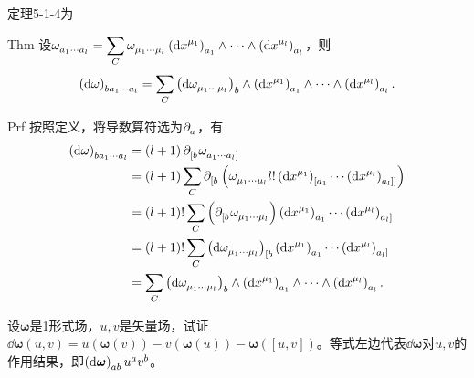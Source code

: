 \begin{xiti}
	\begin{zm}
		定理5-1-4为
		\begin{yl}{Thm}
			设$\displaystyle \tensor{\omega}{_{a_1 \cdots a_l }} = \sum_{C} \tensor{\omega}{_{\mu_1 \cdots \mu_l}} \tensor{\left(\dd{x^{\mu_1}}\right)}{_{a_1}} \wedge \cdots \wedge  \tensor{\left(\dd{x^{\mu_l}}\right)}{_{a_l}} $，则\[ \tensor{\left(\dd{\omega}\right)}{_{b a_1 \cdots a_l}} = \sum_{C} \tensor{\left(\dd{\tensor{\omega}{_{\mu_1 \cdots \mu_l}}}\right)}{_b} \wedge \tensor{\left(\dd{x^{\mu_1}}\right)}{_{a_1}} \wedge \cdots \wedge \tensor{\left(\dd{x^{\mu_l}}\right)}{_{a_l}}. \]
		\end{yl}
	    \begin{yl}{Prf}
	    	按照定义，将导数算符选为$\Partial{a} $，有
	    	\begin{align*}
	    	\tensor{\left(\dd{\omega}\right)}{_{b a_1 \cdots a_l}} &= \left(l+1\right) \Partial{[b} \tensor{\omega}{_{a_1 \cdots a_l]}}\\
	    	&= \left(l+1\right) \sum_{C} \Partial{[b} \left(\tensor{\omega}{_{\mu_1 \cdots \mu_l}} l! \tensor{\left(\dd{x^{\mu_1}}\right)}{_{[a_1}} \cdots   \tensor{\left(\dd{x^{\mu_l}}\right)}{_{a_l]]}}\right) \\
	    	&= \left(l+1\right)! \sum_{C}\left(\Partial{[b} \tensor{\omega}{_{\mu_1 \cdots \mu_l}}\right) \tensor{\left(\dd{x^{\mu_1}}\right)}{_{a_1}} \cdots \tensor{\left(\dd{x^{\mu_l}}\right)}{_{a_l]}}\\
	    	&= \left(l+1\right)! \sum_{C} \tensor{\left( \dd{\tensor{\omega}{_{\mu_1 \cdots \mu_l}}} \right)}{_{[b}}  \tensor{\left(\dd{x^{\mu_1}}\right)}{_{a_1}} \cdots \tensor{\left(\dd{x^{\mu_l}}\right)}{_{a_l]}}\\
	    	&= \sum_{C} \tensor{\left(\dd{\tensor{\omega}{_{\mu_1 \cdots \mu_l}}}\right)}{_b} \wedge \tensor{\left(\dd{x^{\mu_1}}\right)}{_{a_1}} \wedge \cdots \wedge \tensor{\left(\dd{x^{\mu_l}}\right)}{_{a_l}}.
	    	\end{align*}
	    \end{yl}
	\end{zm}

	\item 设$\boldsymbol{\omega} $是1形式场，$u,v$是矢量场，试证$\dd{\boldsymbol{\omega}} \left(u,v\right) = u\left(\boldsymbol{\omega}(v)\right) - v\left(\boldsymbol{\omega}(u)\right) - \boldsymbol{\omega}\left([u,v]\right) $。等式左边代表$\dd{\boldsymbol{\omega}}$对$u,v$的作用结果，即$ \tensor{\left( \dd{\boldsymbol{\omega}} \right)}{_a_b} \tensor{u}{^a} \tensor{v}{^b} $。


\end{xiti}

